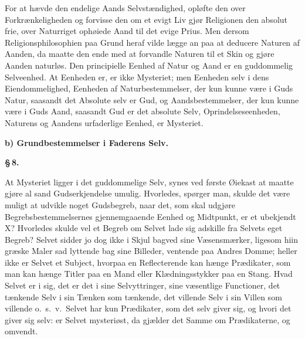 \documentclass[12pt]{book}
\newcommand{\parmark}[1]{\begin{center}{\bfseries \S\,#1.}\end{center}}
\newcommand{\runhead}[1]{%
  \medskip\begin{center}{\bfseries #1}\end{center}\medskip}
\begin{document}
For at hævde den endelige Aands Selvstændighed, opløfte den over
Forkrænkeligheden og forvisse den om et evigt Liv gjør Religionen
den absolut frie, over Naturriget ophøiede Aand til det evige Prius.
Men dersom Religionsphilosophien paa Grund heraf vilde lægge an paa
at deducere Naturen af Aanden, da maatte den ende med at forvandle
Naturen til et Skin og gjøre Aanden naturløs. Den principielle
Eenhed af Natur og Aand er en guddommelig Selveenhed. At Eenheden
er, er ikke Mysteriet; men Eenheden selv i dens Eiendommelighed,
Eenheden af Naturbestemmelser, der kun kunne være i Guds Natur,
saasandt det Absolute selv er Gud, og Aandsbestemmelser, der kun
kunne være i Guds Aand, saasandt Gud er det absolute Selv,
Oprindelseseenheden, Naturens og Aandens urfaderlige Eenhed, er
Mysteriet.
\runhead{b) Grundbestemmelser i Faderens Selv.}
\parmark{8}

At Mysteriet ligger i det guddommelige Selv, synes ved første
Øiekast at maatte gjøre al sand Gudserkjendelse umulig. Hvorledes,
spørger man, skulde det være muligt at udvikle noget Gudsbegreb,
naar det, som skal udgjøre Begrebsbestemmelsernes gjennemgaaende
Eenhed og Midtpunkt, er et ubekjendt X? Hvorledes skulde vel et
Begreb om Selvet lade sig adskille fra Selvets eget Begreb? Selvet
sidder jo dog ikke i Skjul bagved sine Væsensmærker, ligesom hiin
græske Maler sad lyttende bag sine Billeder, ventende paa Andres
Domme; heller ikke er Selvet et Subject, hvorpaa en Reflecterende
kan hænge Prædikater, som man kan hænge Titler paa en Mand eller
Klædningsstykker paa en Stang. Hvad Selvet er i sig, det er det i
sine Selvyttringer, sine væsentlige Functioner, det tænkende Selv i
sin Tænken som tænkende, det villende Selv i sin Villen som villende
o.\ s.\ v.\ Selvet har kun Prædikater, som det selv giver sig, og
hvori det giver sig selv: er Selvet mysteriøst, da gjælder det Samme
om Prædikaterne, og omvendt.
\end{document}
